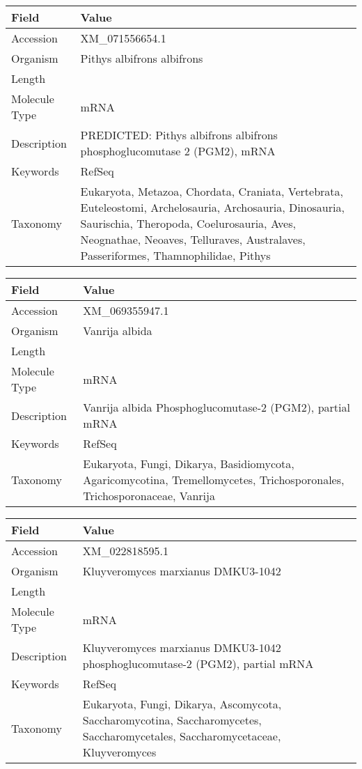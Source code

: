 \documentclass[10pt]{article}
\begin{document}
{\footnotesize
\begin{longtable}{>{\raggedright\arraybackslash}p{4.5cm} >{\raggedright\arraybackslash}p{11.5cm}}
\textbf{Field} & \textbf{Value} \\
\hline
Accession & XM\_071556654.1 \\
Organism & Pithys albifrons albifrons \\
Length & 2240 \\
Molecule Type & mRNA \\
Description & PREDICTED: Pithys albifrons albifrons phosphoglucomutase 2 (PGM2), mRNA \\
Keywords & RefSeq \\
Taxonomy & Eukaryota, Metazoa, Chordata, Craniata, Vertebrata, Euteleostomi, Archelosauria, Archosauria, Dinosauria, Saurischia, Theropoda, Coelurosauria, Aves, Neognathae, Neoaves, Telluraves, Australaves, Passeriformes, Thamnophilidae, Pithys \\
\end{longtable}
}

{\footnotesize
\begin{longtable}{>{\raggedright\arraybackslash}p{4.5cm} >{\raggedright\arraybackslash}p{11.5cm}}
\textbf{Field} & \textbf{Value} \\
\hline
Accession & XM\_069355947.1 \\
Organism & Vanrija albida \\
Length & 1713 \\
Molecule Type & mRNA \\
Description & Vanrija albida Phosphoglucomutase-2 (PGM2), partial mRNA \\
Keywords & RefSeq \\
Taxonomy & Eukaryota, Fungi, Dikarya, Basidiomycota, Agaricomycotina, Tremellomycetes, Trichosporonales, Trichosporonaceae, Vanrija \\
\end{longtable}
}

{\footnotesize
\begin{longtable}{>{\raggedright\arraybackslash}p{4.5cm} >{\raggedright\arraybackslash}p{11.5cm}}
\textbf{Field} & \textbf{Value} \\
\hline
Accession & XM\_022818595.1 \\
Organism & Kluyveromyces marxianus DMKU3-1042 \\
Length & 1701 \\
Molecule Type & mRNA \\
Description & Kluyveromyces marxianus DMKU3-1042 phosphoglucomutase-2 (PGM2), partial mRNA \\
Keywords & RefSeq \\
Taxonomy & Eukaryota, Fungi, Dikarya, Ascomycota, Saccharomycotina, Saccharomycetes, Saccharomycetales, Saccharomycetaceae, Kluyveromyces \\
\end{longtable}
}
\end{document}
